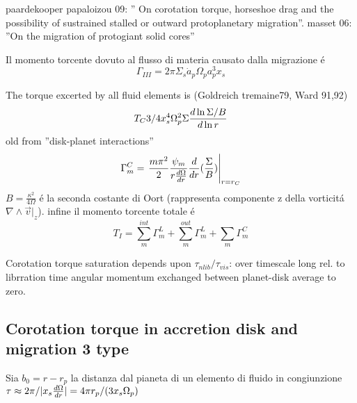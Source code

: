 \begin{workout}
paardekooper papaloizou 09: '' On corotation torque, horseshoe drag and the possibility of sustrained stalled or outward protoplanetary migration''.
masset 06: ''On the migration of protogiant solid cores''
\end{workout}

Il momento torcente dovuto al flusso di materia causato dalla migrazione \'e
\begin{equation}
\Gamma_{III}=2\pi\Sigma_s\dot{a}_p\Omega_pa_p^3x_s
\end{equation}

\begin{workout}
The torque excerted by all fluid elements is (Goldreich tremaine79, Ward 91,92)
\begin{equation}
T_C3/4x_s^4\Omega_p^2\Sigma\TDly{r}{\Sigma/B}
\end{equation}
old from ''disk-planet interactions''
\begin{equation}
\Gamma_m^C=\left.\frac{m\pi^2}{2}\frac{\psi_m}{r\TDy{r}{\Omega}}\TDof{r}(\frac{\Sigma}{B})\right|_{r=r_C}
\end{equation}
$B=\frac{\kappa^2}{4\Omega}$ \'e la seconda costante di Oort (rappresenta componente z della vorticit\'a $\nabla\wedge\vec{v}|_z$).
infine il momento torcente totale \'e
\begin{equation}T_I=\sum_{m}^{int}\Gamma_m^L+\sum_{m}^{out}\Gamma_m^L+\sum_{m}\Gamma_m^C\end{equation}

Corotation torque saturation depends upon $\tau_{nlib}/\tau_{vis}$: over timescale long rel. to librration time angular momentum exchanged between planet-disk average to zero.
\end{workout}

\subsection{Corotation torque in accretion disk and migration 3 type}
Sia $b_0=r-r_p$ la distanza dal pianeta di un elemento di fluido in congiunzione
$\tau\approx2\pi/|x_s\TDy{r}{\Omega}|=4\pi r_p/(3x_s\Omega_p)$


